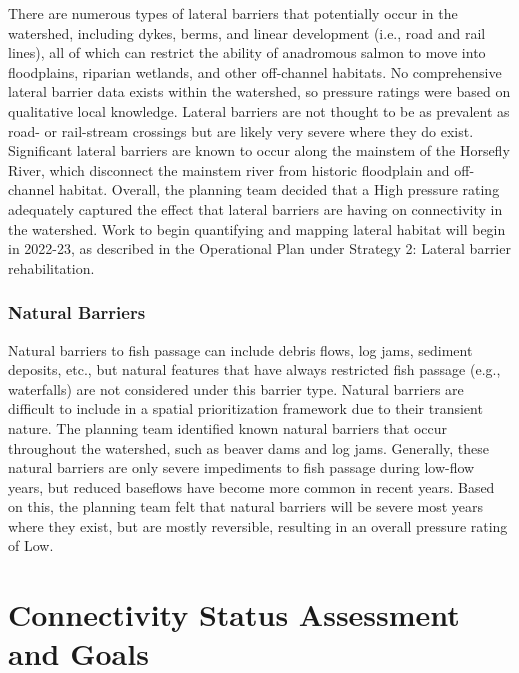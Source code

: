 \documentclass[
  letterpaper,
  DIV=11,
  numbers=noendperiod]{scrreprt}
\begin{document}
There are numerous types of lateral barriers that potentially occur in
the watershed, including dykes, berms, and linear development (i.e.,
road and rail lines), all of which can restrict the ability of
anadromous salmon to move into floodplains, riparian wetlands, and other
off-channel habitats. No comprehensive lateral barrier data exists
within the watershed, so pressure ratings were based on qualitative
local knowledge. Lateral barriers are not thought to be as prevalent as
road- or rail-stream crossings but are likely very severe where they do
exist. Significant lateral barriers are known to occur along the
mainstem of the Horsefly River, which disconnect the mainstem river from
historic floodplain and off-channel habitat. Overall, the planning team
decided that a High pressure rating adequately captured the effect that
lateral barriers are having on connectivity in the watershed. Work to
begin quantifying and mapping lateral habitat will begin in 2022-23, as
described in the Operational Plan under Strategy 2: Lateral barrier
rehabilitation.

\subsection*{Natural Barriers}\label{natural-barriers}

Natural barriers to fish passage can include debris flows, log jams,
sediment deposits, etc., but natural features that have always
restricted fish passage (e.g., waterfalls) are not considered under this
barrier type. Natural barriers are difficult to include in a spatial
prioritization framework due to their transient nature. The planning
team identified known natural barriers that occur throughout the
watershed, such as beaver dams and log jams. Generally, these natural
barriers are only severe impediments to fish passage during low-flow
years, but reduced baseflows have become more common in recent years.
Based on this, the planning team felt that natural barriers will be
severe most years where they exist, but are mostly reversible, resulting
in an overall pressure rating of Low.


\chapter*{Connectivity Status Assessment and
Goals}\label{connectivity-status-assessment-and-goals}
\end{document}
